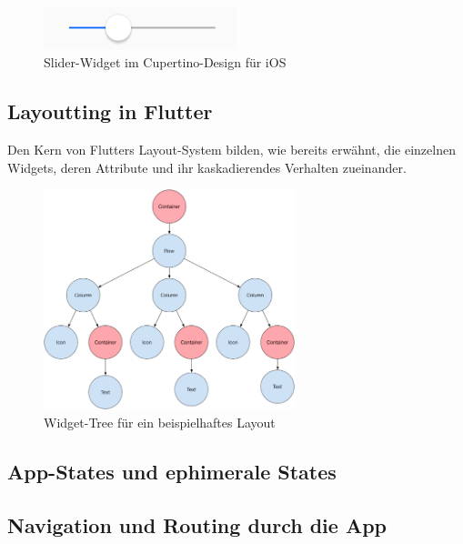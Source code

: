 \begin{figure}[H]
    \begin{center}
        \includegraphics[width=0.5\textwidth]{images/Flutter/cupertino-slider.png}
        \caption{Slider-Widget im Cupertino-Design für iOS}
    \end{center}
\end{figure}

\subsection{Layoutting in Flutter}

Den Kern von Flutters Layout-System bilden, wie bereits erwähnt, die einzelnen Widgets, deren Attribute und ihr
kaskadierendes Verhalten zueinander.


\begin{figure}[H]
    \begin{center}
        \includegraphics[width=0.65\textwidth]{images/Flutter/widget-tree.png}
        \caption{Widget-Tree für ein beispielhaftes Layout}
    \end{center}
\end{figure}



\subsection{App-States und ephimerale States}

\subsection{Navigation und Routing durch die App}











